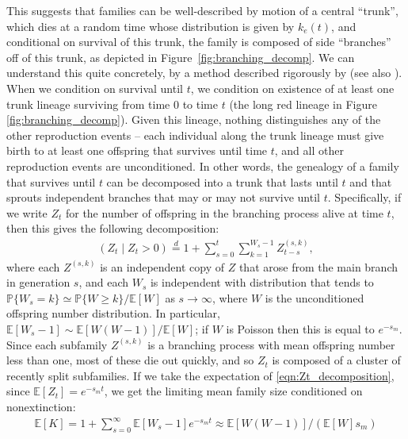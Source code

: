 \documentclass{article}
\newcommand{\linelabel}[1]{}
\newcommand{\citet}[1]{\cite{#1}}
\renewcommand{\P}{\mathbb{P}}
\newcommand{\E}{\mathbb{E}}
\newcommand{\deq}{\stackrel{\scriptscriptstyle{d}}{=}}
\begin{document}
This suggests that families can be well-described by motion of a central ``trunk'',
which dies at a random time whose distribution is given by $k_e(t)$,
and conditional on survival of this trunk, the family is composed of side ``branches'' off of this trunk,
as depicted in Figure~\ref{fig:branching_decomp}.
We can understand this quite concretely, by a method described rigorously by \citet{geiger1999elementary} (see also \citet{chauvin1991growing}). 
When we condition on survival until $t$, we condition on existence of
at least one trunk lineage surviving from time $0$ to time $t$ (the long red
lineage in Figure \ref{fig:branching_decomp}).
Given this lineage, nothing distinguishes any of the other reproduction events --
each individual along the trunk lineage must give birth to at least one offspring that survives until time $t$,
and all other reproduction events are unconditioned.
In other words, the genealogy of a family that survives until $t$
can be decomposed into a trunk that lasts until $t$
and that sprouts independent branches that may or may not survive until $t$.
Specifically, if we write $Z_t$ for the number of offspring in the branching process alive at time $t$,
then this gives the following decomposition:
\begin{align} \label{eqn:Zt_decomposition}
  \left( Z_t \; \vert \; Z_t>0 \right) \deq 1 + \sum_{s=0}^t \sum_{k=1}^{W_s-1} Z^{(s,k)}_{t-s},
\end{align}
where each $Z^{(s,k)}$ is an independent copy of $Z$ 
that arose from the main branch in generation $s$,
and each $W_s$ is independent with distribution 
that tends to $\P\{W_s=k\} \simeq \P\{W\ge k\}/\E[W]$ as $s \to \infty$,
where $W$ is the unconditioned offspring number distribution.  \linelabel{ll:branching_process_fix}
In particular, $\E[W_s-1] \sim \E[W(W-1)]/\E[W]$;
if $W$ is Poisson then this is equal to $e^{-s_m}$.
Since each subfamily $Z^{(s,k)}$ is a branching process with mean offspring number less than one,
most of these die out quickly,
and so $Z_t$ is composed of a cluster of recently split subfamilies.
If we take the expectation of \eqref{eqn:Zt_decomposition},
since $\E[Z_t] = e^{-s_m t}$,
we get the limiting mean family size conditioned on nonextinction:
\begin{align} \label{eqn:mean_K}
    \E[K] 
    = 1 + \sum_{s=0}^\infty \E[W_s-1] e^{-s_m t}
    \approx \E[W(W-1)] / ( \E[W] s_m  )
\end{align}
\end{document}
